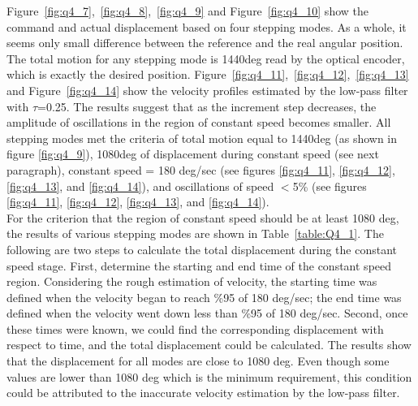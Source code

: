\documentclass{article}
\theoremstyle{plain}
\theoremstyle{definition}
\theoremstyle{remark}
\begin{document}
Figure~\ref{fig:q4_7},~\ref{fig:q4_8},~\ref{fig:q4_9} and Figure~\ref{fig:q4_10} show the command and actual displacement based on four stepping modes. As a whole, it seems only small difference between the reference and the real angular position. The total motion for any stepping mode is 1440deg read by the optical encoder, which is exactly the desired position. Figure~\ref{fig:q4_11},~\ref{fig:q4_12},~\ref{fig:q4_13} and Figure~\ref{fig:q4_14} show the velocity profiles estimated by the low-pass filter with $\tau$=0.25. The results suggest that as the increment step decreases, the amplitude of oscillations in the region of constant speed becomes smaller. All stepping modes met the criteria of total motion equal to 1440deg (as shown in figure \ref{fig:q4_9}), 1080deg of displacement during constant speed (see next paragraph), constant speed = 180 deg/sec (see figures \ref{fig:q4_11}, \ref{fig:q4_12}, \ref{fig:q4_13}, and \ref{fig:q4_14}), and oscillations of speed $<$5\% (see figures \ref{fig:q4_11}, \ref{fig:q4_12}, \ref{fig:q4_13}, and \ref{fig:q4_14}). \\

For the criterion that the region of constant speed should be at least 1080 deg, the results of various stepping modes are shown in Table~\ref{table:Q4_1}. The following are two steps to calculate the total displacement during the constant speed stage. First, determine the starting and end time of the constant speed region. Considering the rough estimation of velocity, the starting time was defined when the velocity began to reach \%95 of 180 deg/sec; the end time was defined when the velocity went down less than \%95 of 180 deg/sec. Second, once these times were known, we could find the corresponding displacement with respect to time, and the total displacement could be calculated. The results show that the displacement for all modes are close to 1080 deg. Even though some values are lower than 1080 deg which is the minimum requirement, this condition could be attributed to the inaccurate velocity estimation by the low-pass filter.   
\end{document}
